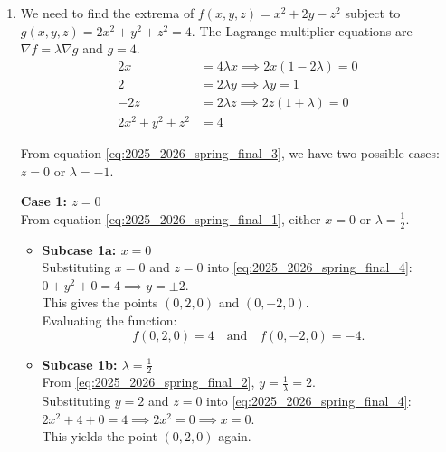 \documentclass[a4paper, 12pt]{article}
\renewcommand{\headrulewidth}{0pt}
\begin{document}
\newpage
\pagestyle{fancy}
\renewcommand{\headrulewidth}{1pt}


\begin{enumerate}[leftmargin=*,label=\textbf{\arabic*.}]
\item We need to find the extrema of $f(x,y,z) = x^2 + 2y - z^2$ subject to $g(x,y,z) = 2x^2 + y^2 + z^2 = 4$.
The Lagrange multiplier equations are $\nabla f = \lambda \nabla g$ and $g = 4$.
\begin{align}
2x &= 4\lambda x \implies 2x(1 - 2\lambda) = 0 \label{eq:2025_2026_spring_final_1} \\
2 &= 2\lambda y \implies \lambda y = 1 \label{eq:2025_2026_spring_final_2} \\
-2z &= 2\lambda z \implies 2z(1 + \lambda) = 0 \label{eq:2025_2026_spring_final_3} \\
2x^2 + y^2 + z^2 &= 4 \label{eq:2025_2026_spring_final_4}
\end{align}

From equation \eqref{eq:2025_2026_spring_final_3}, we have two possible cases: $z = 0$ or $\lambda = -1$.

\textbf{Case 1: $z = 0$} \\
From equation  \eqref{eq:2025_2026_spring_final_1}, either $x = 0$ or $\lambda = \frac{1}{2}$.
\begin{itemize}
    \item \textbf{Subcase 1a: $x = 0$} \\
    Substituting $x = 0$ and $z = 0$ into \eqref{eq:2025_2026_spring_final_4}: $0 + y^2 + 0 = 4 \implies y = \pm 2$.\\
    This gives the points $(0, 2, 0)$ and $(0, -2, 0)$.\\
    Evaluating the function:
    \[
    f(0, 2, 0) = 4 \quad \text{and} \quad f(0, -2, 0) = -4.
    \]
    \item \textbf{Subcase 1b: $\lambda = \frac{1}{2}$} \\
    From \eqref{eq:2025_2026_spring_final_2}, $y = \frac{1}{\lambda} = 2$.\\
    Substituting $y = 2$ and $z = 0$ into \eqref{eq:2025_2026_spring_final_4}: $2x^2 + 4 + 0 = 4 \implies 2x^2 = 0 \implies x = 0$.\\
    This yields the point $(0, 2, 0)$ again.
\end{itemize}


\end{enumerate}
\end{document}
